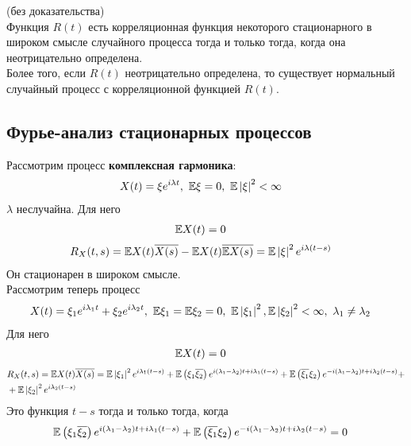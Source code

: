 \begin{theorem} (без доказательства)
    \\
    Функция $R(t)$ есть корреляционная функция некоторого стационарного в
    широком смысле случайного процесса тогда и только тогда, когда она
    неотрицательно определена.
    \\
    Более того, если $R(t)$ неотрицательно определена, то существует нормальный
    случайный процесс с корреляционной функцией $R(t)$.
\end{theorem}
\subsection{Фурье-анализ стационарных процессов}
Рассмотрим процесс \textbf{комплексная гармоника}:
\begin{align*}
  & X(t) = \xi e^{i\lambda t}, \ \mathbb{E} \xi = 0, \ \mathbb{E} \left| \xi \right|^2 < \infty
\end{align*}
$\lambda$ неслучайна. Для него
\begin{align*}
  & \mathbb{E} X(t) = 0
\end{align*}
\begin{align*}
  & R_X(t,s) = \mathbb{E} X(t) \overline{X(s)} - \mathbb{E} X(t) \overline{\mathbb{E} X(s)} = \mathbb{E}\left| \xi \right|^2e^{i\lambda(t-s)}
\end{align*}
Он стационарен в широком смысле.
\\
Рассмотрим теперь процесс
\begin{align*}
  & X(t) = \xi_1 e^{i\lambda_1 t} + \xi_2 e^{i\lambda_2 t}, \ \mathbb{E} \xi_1 = \mathbb{E} \xi_2 = 0, \ \mathbb{E} \left| \xi_1 \right|^2, \mathbb{E} \left| \xi_2 \right|^2 < \infty, \ \lambda_1 \neq \lambda_2
\end{align*}
Для него
\begin{align*}
  & \mathbb{E} X(t) = 0
\end{align*}
\begin{align*}
  & R_X(t,s) = \mathbb{E} X(t) \overline{X(s)} = \mathbb{E} \left| \xi_1 \right|^2 e^{i \lambda_1 (t-s)} + \mathbb{E} \left( \xi_1\overline{\xi_2} \right) e^{i(\lambda_1-\lambda_2)t+i\lambda_1(t-s)} + \mathbb{E} \left( \overline{\xi_1}\xi_2 \right) e^{-i(\lambda_1-\lambda_2)t+i\lambda_2(t-s)} + \\
  & + \mathbb{E} \left| \xi_2 \right|^2 e^{i \lambda_2 (t-s)}
\end{align*}
Это функция $t-s$ тогда и только тогда, когда
\begin{align*}
  & \mathbb{E} \left( \xi_1\overline{\xi_2} \right) e^{i(\lambda_1-\lambda_2)t+i\lambda_1(t-s)} + \mathbb{E} \left( \overline{\xi_1}\xi_2 \right) e^{-i(\lambda_1-\lambda_2)t+i\lambda_2(t-s)} = 0
\end{align*}
